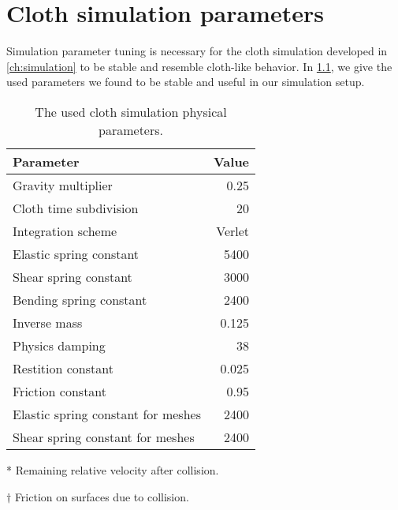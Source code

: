\documentclass[\home/main.tex]{subfiles}
\begin{document}
\chapter{Cloth simulation parameters}\label{appx:cloth_sim_params}
Simulation parameter tuning is necessary for the cloth simulation developed in \cref{ch:simulation} to be stable and resemble cloth-like behavior. In \cref{table:cloth_sim_params}, we give the used parameters we found to be stable and useful in our simulation setup.

\begin{table}[htb]
  \centering
  \begin{threeparttable}
    \caption{The used cloth simulation physical parameters.}
    \begin{tabular}[t]{@{} l r @{}}
      \toprule
      Parameter                          & Value  \\
      \midrule
      Gravity multiplier                 & 0.25   \\
      Cloth time subdivision             & 20     \\
      Integration scheme                 & Verlet \\
      Elastic spring constant            & 5400   \\
      Shear spring constant              & 3000   \\
      Bending spring constant            & 2400   \\
      Inverse mass                       & 0.125  \\
      Physics damping                    & 38     \\
      Restition constant\tnote{*}        & 0.025  \\
      Friction constant\tnote{$\dagger$} & 0.95   \\
      Elastic spring constant for meshes & 2400   \\
      Shear spring constant for meshes   & 2400   \\

      \bottomrule
    \end{tabular}
    \begin{tablenotes}\footnotesize
      \item[*] Remaining relative velocity after collision.
      \item[$\dagger$] Friction on surfaces due to collision.
    \end{tablenotes}

    \label{table:cloth_sim_params}
  \end{threeparttable}
\end{table}
\end{document}
